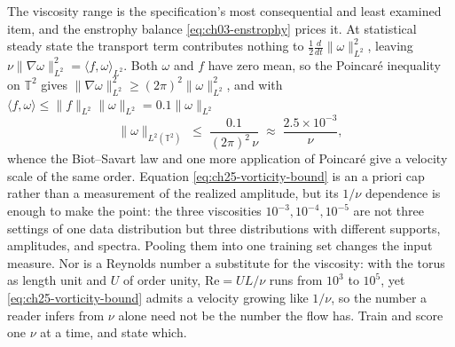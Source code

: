 The viscosity range is the specification's most consequential and least examined
item, and the enstrophy balance \eqref{eq:ch03-enstrophy} prices it. At statistical
steady state the transport term contributes nothing to
$\tfrac{1}{2}\tfrac{d}{dt}\|\omega\|_{L^2}^{2}$, leaving
$\nu\|\nabla\omega\|_{L^2}^{2} = \langle f, \omega\rangle_{L^2}$. Both $\omega$ and
$f$ have zero mean, so the Poincar\'e inequality on $\mathbb{T}^2$ gives
$\|\nabla\omega\|_{L^2}^{2} \ge (2\pi)^{2}\|\omega\|_{L^2}^{2}$, and with
$\langle f,\omega\rangle \le \|f\|_{L^2}\|\omega\|_{L^2} = 0.1\|\omega\|_{L^2}$
\begin{equation}
  \label{eq:ch25-vorticity-bound}
  \|\omega\|_{L^2(\mathbb{T}^2)} \;\le\; \frac{0.1}{(2\pi)^{2}\,\nu}
  \;\approx\; \frac{2.5 \times 10^{-3}}{\nu},
\end{equation}
whence the Biot--Savart law and one more application of Poincar\'e give a velocity
scale of the same order. Equation \eqref{eq:ch25-vorticity-bound} is an a priori
cap rather than a measurement of the realized amplitude, but its
$1/\nu$ dependence is enough to make the point: the three viscosities
$10^{-3}, 10^{-4}, 10^{-5}$ are not three settings of one data distribution but
three distributions with different supports, amplitudes, and spectra. Pooling them
into one training set changes the input measure. Nor is a Reynolds number a
substitute for the viscosity: with the torus as length unit and $U$ of order
unity, $\mathrm{Re} = UL/\nu$ runs from $10^{3}$ to $10^{5}$, yet
\eqref{eq:ch25-vorticity-bound} admits a velocity growing like $1/\nu$, so the
number a reader infers from $\nu$ alone need not be the number the flow has.
Train and score one $\nu$ at a time, and state which.

